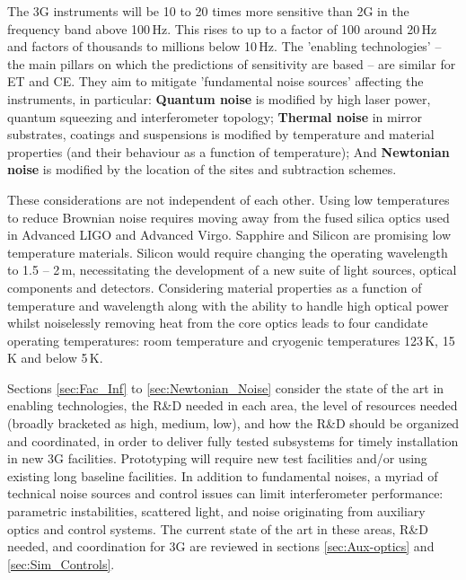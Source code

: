 The 3G instruments will be 10 to 20 times more sensitive than 2G in the frequency band above  100\,Hz.  This rises to up to a factor of 100 around 20\,Hz and factors of thousands to millions below 10\,Hz. 
The 'enabling technologies' -- the main pillars on which the predictions of sensitivity are based --  are similar for ET and CE. They aim to mitigate 'fundamental noise sources' affecting the instruments, in particular: \textbf{Quantum noise} is modified by high laser power, quantum squeezing and interferometer topology; \textbf{Thermal noise} in mirror substrates, coatings and suspensions is modified by temperature and material properties (and their behaviour as a function of temperature); And \textbf{Newtonian noise} is modified by the location of the sites and subtraction schemes. 
   
These considerations are not independent of each other. Using low temperatures to reduce Brownian noise requires moving away from the fused silica optics used in Advanced LIGO and Advanced Virgo. Sapphire and Silicon are promising low temperature materials. Silicon would require changing the operating wavelength to 1.5 -- 2\,\micro m, necessitating the development of a new suite of light sources, optical components and detectors.  Considering material properties as a function of temperature and wavelength along with the ability to handle high optical power whilst noiselessly removing heat from the core optics leads to four candidate operating temperatures:  room temperature and cryogenic temperatures 123\,K, 15\,K and below 5\,K.  

Sections \ref{sec:Fac_Inf} to \ref{sec:Newtonian_Noise} consider the state of the art in enabling technologies, the R\&D needed in each area, the level of resources needed (broadly bracketed as high, medium, low),
and how the R\&D should be organized and coordinated, in order to deliver fully tested subsystems for timely installation in new 3G facilities. Prototyping will require new test facilities and/or using existing long baseline facilities.
In addition to fundamental noises, a myriad of technical noise sources and control issues can limit interferometer performance: parametric instabilities, scattered light, and noise originating from auxiliary optics and control systems.  The current state of the art in these areas, R\&D needed, and coordination for 3G are reviewed in sections \ref{sec:Aux-optics} and \ref{sec:Sim_Controls}. 

